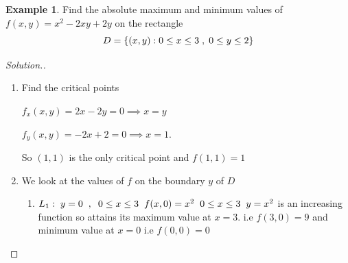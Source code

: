 \documentclass[11pt,a4paper]{article}
\theoremstyle{definition}
\newtheorem{exa}[thm]{Example}
\newenvironment{solution}
  {\renewcommand{\qedsymbol}{}\begin{proof}[\textit{Solution}.]}
  {\end{proof}}
\begin{document}
\begin{exa}


Find the absolute maximum and minimum values of $f(x,y) = x^2 - 2xy + 2y$ on the rectangle $$ D = \{(x,y): 0\leq x \leq 3\hspace{0.1cm} , \hspace{0.1cm} 0\leq y \leq 2\}$$
\end{exa}

\begin{solution}
\begin{enumerate}
\item[\textit{Step 1:}] Find the critical points

$f_x (x,y) = 2x - 2y = 0 \implies x = y$

$f_y (x,y) = -2x + 2 = 0 \implies x = 1$.

So $(1,1)$ is the only critical point and $f(1,1) = 1$


\begin{figure}[H]
\centering
{}
\end{figure}

\item[\textit{Step 2:}] We look at the values of $f$ on the boundary $y$ of $D$
\begin{enumerate}
     \item[On] $L_1:\hspace{0.1cm} y = 0\hspace{0.2cm} , \hspace{0.2cm} 0\leq x\leq 3\hspace{0.2cm} f(x,0) = x^2 \hspace{0.2cm} 0\leq x \leq 3\hspace{0.2cm} y = x^2$ is an increasing function so attains its maximum value at $x = 3$.
     i.e $f(3,0) = 9$ and minimum value at $x = 0$ i.e $f(0,0) = 0$


\begin{figure}[H]
\centering
{}
\end{figure}


\end{enumerate}
\end{enumerate}
\end{solution}
\end{document}
